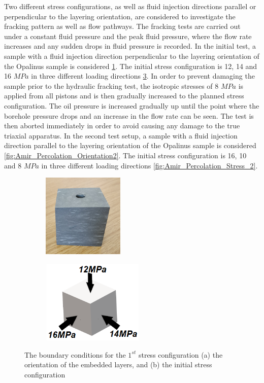Two different stress configurations, as well as fluid injection directions parallel or perpendicular to the layering orientation, are considered to investigate the fracking pattern as well as flow pathways. The fracking tests are carried out under a constant fluid pressure and the peak fluid pressure, where the flow rate increases and any sudden drops in fluid pressure is recorded. In the initial test, a sample with a fluid injection direction perpendicular to the layering orientation of the Opalinus sample is considered \ref{fig:Amir_Percolation_Orientation1}. The initial stress configuration is 12, 14 and 16 $MPa$ in three different loading directions \ref{fig:Amir_Percolation_Stress_1}. In order to prevent damaging the sample prior to the hydraulic fracking test, the isotropic stresses of 8 $MPa$ is applied from all pistons and is then gradually increased to the planned stress configuration. The oil pressure is increased gradually up until the point where the borehole pressure drops and an increase in the flow rate can be seen. The test is then aborted immediately in order to avoid causing any damage to the true triaxial apparatus. In the second test setup, a sample with a fluid injection direction parallel to the layering orientation of the Opalinus sample is considered \ref{fig:Amir_Percolation_Orientation2}. The initial stress configuration is 16, 10 and 8 $MPa$ in three different loading directions \ref{fig:Amir_Percolation_Stress_2}.


\begin{figure}[!ht]
\begin{subfigure}[c]{0.48\textwidth}
\includegraphics[width=4cm,height=4cm]{figures/Amir_Percolation_Orientation1.png}
\subcaption{}
\label{fig:Amir_Percolation_Orientation1}
\end{subfigure}
\hfill
\begin{subfigure}[c]{0.48\textwidth}
\includegraphics[width=5cm,height=4cm]{figures/Amir_Percolation_Stress_1.png}
\subcaption{}
\label{fig:Amir_Percolation_Stress_1}
\end{subfigure}
\caption{The boundary conditions for the $1^{st}$ stress configuration (a) the orientation of the embedded layers, and (b) the initial stress configuration}
\end{figure}

